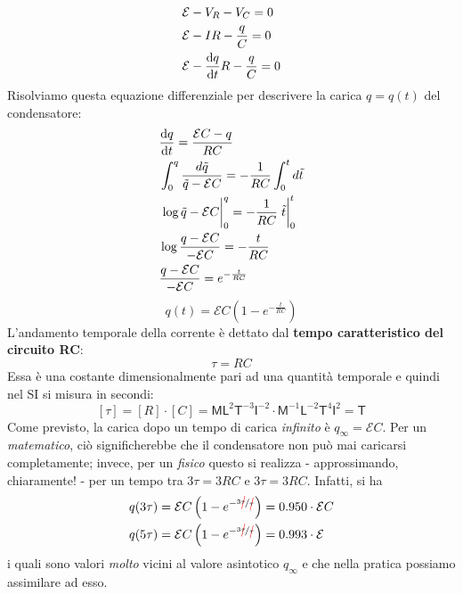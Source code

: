 \begin{align*}
	&\mathcal{E}-V_R-V_C=0\\
	&\mathcal{E}-IR-\frac{q}{C}=0\\
	&\mathcal{E}-\dv{q}{t}R-\frac{q}{C}=0
\end{align*}
Risolviamo questa equazione differenziale per descrivere la carica $q=q(t)$ del condensatore:
\begin{align*}%
	&\dv{q}{t}=\frac{\mathcal{E}C-q}{RC}\\ &\int_{0}^{q}\frac{d\tilde{q}}{\tilde{q}-\mathcal{E}C}=-\frac{1}{RC}\int_{0}^{t}d\tilde{t}\\
	&\eval{\log{\tilde{q}-\mathcal{E}C}}_{0}^{q}=-\frac{1}{RC}\eval{\tilde{t}}_{0}^{t}\\
	&\log{\frac{q-\mathcal{E}C}{-\mathcal{E}C}}=-\frac{t}{RC}\\
	&\frac{q-\mathcal{E}C}{-\mathcal{E}C}=e^{-\frac{t}{RC}}
\end{align*}
\begin{equation}
	q(t)=\mathcal{E}C\left(1-e^{-\frac{t}{RC}}\right)
\end{equation}
L'andamento temporale della corrente è dettato dal \textbf{tempo caratteristico del circuito RC}:
\begin{equation}
	\tau=RC
\end{equation}
Essa è una costante dimensionalmente pari ad una quantità temporale e quindi nel SI si misura in secondi:
\begin{equation*}
	\left[\tau\right]=\left[R\right]\cdot\left[C\right]=\mathsf{M} \mathsf{L}^2  \mathsf{T}^{-3}\mathsf{I}^{-2}\cdot\mathsf{M}^{-1}\mathsf{L}^{-2}\mathsf{T}^4\mathsf{I}^2=\mathsf{T}
\end{equation*}
Come previsto, la carica dopo un tempo di carica \textit{infinito} è $q_{\infty}=\mathcal{E}C$. Per un \textit{matematico}, ciò significherebbe che il condensatore non può mai caricarsi completamente; invece, per un \textit{fisico} questo si realizza - approssimando, chiaramente! - per un tempo tra $3\tau=3RC$ e $3\tau=3RC$. Infatti, si ha
\begin{align*}
q(3\tau)&=\mathcal{E}C\left(1-e^{-\nicefrac{3\Ccancel[red]{\tau}}{\Ccancel[red]{\tau}}}\right)=\num{0.950}\cdot\mathcal{E}C\\
q(5\tau)&=\mathcal{E}C\left(1-e^{-\nicefrac{3\Ccancel[red]{\tau}}{\Ccancel[red]{\tau}}}\right)=\num{0.993}\cdot\mathcal{E}
\end{align*}
i quali sono valori \textit{molto} vicini al valore asintotico $q_{\infty}$ e che nella pratica possiamo assimilare ad esso.\\
